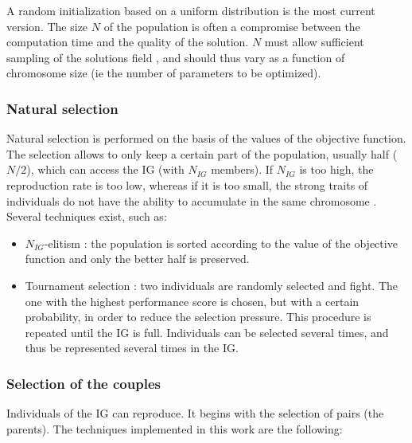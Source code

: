 \documentclass[twocol]{ametsoc}
\begin{document}
A random initialization based on a uniform distribution is the most current version. The size $N$ of the population is often a compromise between the computation time and the quality of the solution. $N$ must allow sufficient sampling of the solutions field \citep{Beasley1996a}, and should thus vary as a function of chromosome size (ie the number of parameters to be optimized). 


\subsubsection{Natural selection}

Natural selection is performed on the basis of the values of the objective function. The selection allows to only keep a certain part of the population, usually half ($N/2$), which can access the IG (with $N_{IG}$ members). If $N_{IG}$ is too high, the reproduction rate is too low, whereas if it is too small, the strong traits of individuals do not have the ability to accumulate in the same chromosome \citep{Haupt2004}. Several techniques exist, such as:

\begin{itemize}
	\item $N_{IG}$-elitism \citep{Michalewicz1996}: the population is sorted according to the value of the objective function and only the better half is preserved. 
	
	\item Tournament selection \citep{Michalewicz1996, Zitzler2004a}: two individuals are randomly selected and fight. The one with the highest performance score is chosen, but with a certain probability, in order to reduce the selection pressure. This procedure is repeated until the IG is full. Individuals can be selected several times, and thus be represented several times in the IG.
\end{itemize}


\subsubsection{Selection of the couples}

Individuals of the IG can reproduce. It begins with the selection of pairs (the parents). The techniques implemented in this work are the following:
\end{document}
